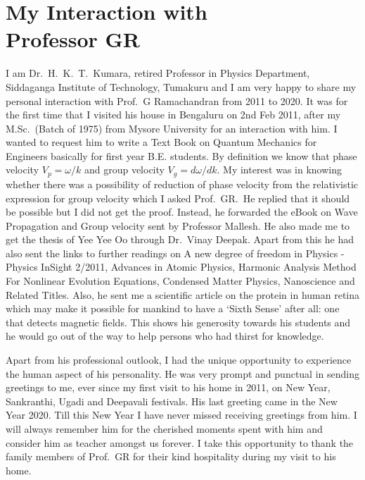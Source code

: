 \chapter[My Interaction with Prof.\ GR]{My Interaction with\\ Professor GR}



I am Dr.\ H.\ K.\ T.\ Kumara, retired Professor in Physics Department, Siddaganga Institute of Technology, Tumakuru and I am very happy to share my personal interaction with Prof.\ G Ramachandran from 2011 to 2020. It was for the first time that I visited his house in Bengaluru on 2nd Feb 2011, after my M.Sc.\ (Batch of 1975) from Mysore University for an interaction with him. I wanted to request him to write a Text Book on Quantum Mechanics for Engineers basically for first year B.E. students. By definition we know that phase velocity $V_p=\omega/k$ and group velocity $V_g=d\omega/dk$.  My interest was in knowing whether there was a possibility of reduction of phase velocity from the relativistic expression for group velocity which I asked Prof.\ GR.\  He replied that it should be possible but I did not get the proof. Instead, he forwarded the eBook on Wave Propagation and Group velocity sent by Professor Mallesh.  He also made me to get the thesis of Yee Yee Oo through Dr.\ Vinay Deepak. Apart from this he had also sent the links to further readings on A new degree of freedom in Physics - Physics InSight 2/2011, Advances in Atomic Physics, Harmonic Analysis Method For Nonlinear Evolution Equations, Condensed Matter Physics, Nanoscience and Related Titles.  Also, he sent me a scientific article on the protein in human retina which may make it possible for mankind to have a ‘Sixth Sense’ after all: one that detects magnetic fields. This shows his generosity towards his students and he would go out of the way to help persons who had thirst for knowledge. 

Apart from his professional outlook, I had the unique opportunity to experience the human aspect of his personality.  He was very prompt and punctual in sending greetings to me, ever since my first visit to his home in 2011, on New Year, Sankranthi, Ugadi and Deepavali festivals.  His last greeting came in the New Year 2020.  Till this New Year I have never missed receiving greetings from him. I will always remember him for the cherished  moments spent with him and consider him as teacher amongst us forever. I take this opportunity to thank the family members of Prof.\ GR for their kind hospitality during my visit to his home.
\vskip 0.5cm

